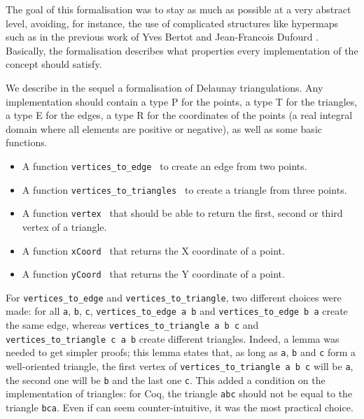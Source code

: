 \documentclass[a4paper,10pt]{article}
\def\ttt#1#2{{\tt{\color{black}#1} #2}}
\begin{document}
The goal of this formalisation was to stay as much as possible at a very abstract level, avoiding, for instance, the use of complicated structures like hypermaps such as in the previous work of Yves Bertot and Jean-Francois Dufourd \cite{Bertot}. Basically, the formalisation describes what properties every implementation of the concept should satisfy.

We describe in the sequel a formalisation of Delaunay triangulations. Any implementation should contain a type P for the points, a type T for the triangles, a type E for the edges, a type R for the coordinates of the points (a real integral domain where all elements are positive or negative), as well as some basic functions.
\begin{itemize}
\item A function \ttt{vertices\_to\_edge}{} to create an edge from two points.
\item A function \ttt{vertices\_to\_triangles}{} to create a triangle from three points.
\item A function \ttt{vertex}{}  that should be able to return the first, second or third vertex of a triangle.
\item A function \ttt{xCoord}{} that returns the X coordinate of a point.
\item A function \ttt{yCoord}{} that returns the Y coordinate of a point.
\end{itemize}

For {\tt vertices\_to\_edge} and {\tt vertices\_to\_triangle}, two different choices were made:
for all {\tt a}, {\tt b}, {\tt c}, {\tt vertices\_to\_edge a b} and {\tt vertices\_to\_edge b a} create the same edge, whereas {\tt vertices\_to\_triangle a b c} and {\tt vertices\_to\_triangle c a b} create different triangles. Indeed, a lemma was needed to get simpler proofs; this lemma states that, as long as {\tt a}, {\tt b} and {\tt c} form a well-oriented triangle, the first vertex of {\tt vertices\_to\_triangle a b c} will be {\tt a}, the second one will be {\tt b} and the last one {\tt c}. This added a condition on the implementation of triangles: for {\sc Coq}, the triangle {\tt abc} should not be equal to the triangle {\tt bca}. Even if can seem counter-intuitive, it was the most practical choice. 
\end{document}
